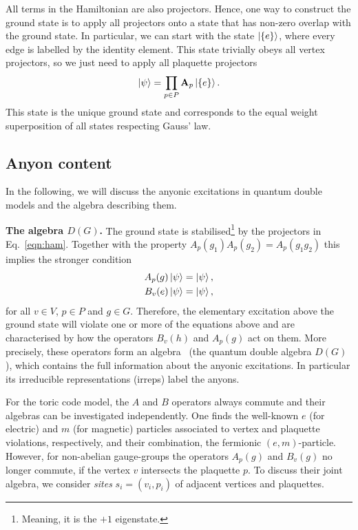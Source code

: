 \documentclass[a4paper,twocolumn,11pt, accepted=2024-06-14]{quantumarticle}
\begin{document}
All terms in the Hamiltonian are also projectors. Hence, one way to construct the ground state is to apply all projectors onto a state that has non-zero overlap with the ground state. In particular, we can start with the state $\ket{\{e\}}$, where every edge is labelled by the identity element.
This state trivially obeys all vertex projectors, so we just need to apply all plaquette projectors
\begin{equation}
    \ket{\psi} = \prod_{p \in P} \mathbf A_p \ket{\{e\}}.
\end{equation}
This state is the unique ground state and corresponds to the equal weight superposition of all states respecting Gauss' law.




\subsection{Anyon content}\label{sec:anyon}
In the following, we will discuss the anyonic excitations in quantum double models and the algebra describing them.

\textbf{The algebra $D(G)$.} The ground state is stabilised\footnote{Meaning, it is the $+1$ eigenstate.} by the projectors in Eq.~\eqref{eqn:ham}. Together with the property $A_p{(g_1)}A_p{(g_2)} = A_p{(g_1 g_2)}$ this implies the stronger condition
\begin{equation}
\begin{split}
    A_p{(g)} \ket{\psi} = \ket{\psi},\\
    B_v{(e)} \ket{\psi} = \ket{\psi},
\end{split}\label{eqn:ground_state}
\end{equation}
for all $v \in V$, $p \in P$ and $g \in G$. Therefore, the elementary excitation above the ground state will violate one or more of the equations above and are characterised by how the operators $B_v(h)$ and $A_p(g)$ act on them. More precisely, these operators form an algebra~\cite{cui2018topological, Kitaev_2003} (the quantum double algebra $D(G)$), which contains the full information about the anyonic excitations. In particular its irreducible representations (irreps) label the anyons.

For the toric code model, the $A$ and $B$ operators always commute and their algebras can be investigated independently. One finds the well-known $e$ (for electric) and $m$ (for magnetic) particles associated to vertex and plaquette violations, respectively, and their combination, the fermionic $(e,m)$-particle. However, for non-abelian gauge-groups the operators $A_p(g)$ and $B_v(g)$ no longer commute, if the vertex $v$ intersects the plaquette $p$. To discuss their joint algebra, we consider \emph{sites}
 $s_i = (v_i, p_i)$ of adjacent vertices and plaquettes.
 
\end{document}
